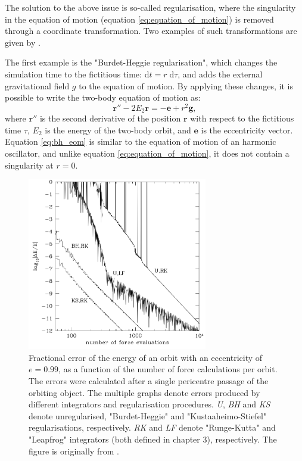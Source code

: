 \documentclass[english, twoside]{HYgradu}
\begin{document}
The solution to the above issue is so-called regularisation, where the singularity in the equation of motion (equation \ref{eq:equation_of_motion}) is removed through a coordinate transformation. Two examples of such transformations are given by \cite{BinneyTremaine}. 

The first example is the "Burdet-Heggie regularisation", which changes the simulation time to the fictitious time: $\mathrm{d}t = r \; \mathrm{d}\tau$, and adds the external gravitational field $g$ to the equation of motion. By applying these changes, it is possible to write the two-body equation of motion as:
\begin{equation}
\mathbf{r}'' - 2E_2\mathbf{r} = - \mathbf{e}+r^2\mathbf{g}, \label{eq:bh_eom}
\end{equation}
where $\mathbf{r}''$ is the second derivative of the position $\mathbf{r}$ with respect to the fictitious time $\tau$, $E_2$ is the energy of the two-body orbit, and $\mathbf{e}$ is the eccentricity vector. Equation \ref{eq:bh_eom} is similar to the equation of motion of an harmonic oscillator, and unlike equation \ref{eq:equation_of_motion}, it does not contain a singularity at $r=0$.

\begin{figure}
	\centering
	\includegraphics[width=0.7\textwidth]{binneytremaine_pic.png}
	\caption{Fractional error of the energy of an orbit with an eccentricity of $e=0.99$, as a function of the number of force calculations per orbit. The errors were calculated after a single pericentre passage of the orbiting object. The multiple graphs denote errors produced by different integrators and regularisation procedures. \textit{U}, \textit{BH} and \textit{KS} denote unregularised, "Burdet-Heggie" and "Kustaaheimo-Stiefel" regularisations, respectively. \textit{RK} and \textit{LF} denote "Runge-Kutta" and "Leapfrog" integrators (both defined in chapter 3), respectively. The figure is originally from \cite{BinneyTremaine}.}
	\label{figure:regularized}
\end{figure}
\end{document}
